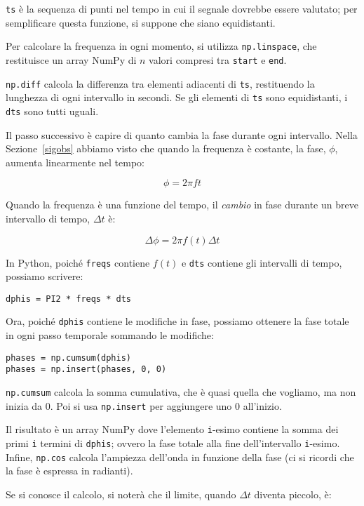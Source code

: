 \documentclass[12pt,a4paper]{book}
\begin{document}
{\tt ts} è la sequenza di punti nel tempo in cui il segnale dovrebbe essere valutato; per semplificare questa funzione, si suppone che siano equidistanti.

Per calcolare la frequenza in ogni momento, si utilizza {\tt np.linspace}, che restituisce un array NumPy di $n$ valori compresi tra {\tt start} e {\tt end}.

{\tt np.diff} calcola la differenza tra elementi adiacenti di {\tt ts}, restituendo la lunghezza di ogni intervallo in secondi. Se gli elementi di {\tt ts} sono equidistanti, i {\tt dts} sono tutti uguali.

Il passo successivo è capire di quanto cambia la fase durante ogni intervallo. Nella Sezione~\ref{sigobs} abbiamo visto che quando la frequenza è costante, la fase, $\phi$, aumenta linearmente nel tempo:

%
\[ \phi = 2 \pi f t \] 

%
Quando la frequenza è una funzione del tempo, il {\em cambio} in fase durante un breve intervallo di tempo, $\Delta t$ è:

%
\[ \Delta \phi = 2 \pi f(t) \Delta t \] 

%
In Python, poiché {\tt freqs} contiene $f(t)$ e {\tt dts} contiene gli intervalli di tempo, possiamo scrivere:

\begin{verbatim} 
dphis = PI2 * freqs * dts
 \end{verbatim} 

Ora, poiché {\tt dphis} contiene le modifiche in fase, possiamo ottenere la fase totale in ogni passo temporale sommando le modifiche:

\begin{verbatim} 
phases = np.cumsum(dphis)
phases = np.insert(phases, 0, 0)
 \end{verbatim} 

{\tt np.cumsum} calcola la somma cumulativa, che è quasi quella che vogliamo, ma non inizia da 0. Poi si usa {\tt np.insert} per aggiungere uno 0 all'inizio.

Il risultato è un array NumPy dove l'elemento {\tt i}-esimo contiene la somma dei primi {\tt i} termini di {\tt dphis}; ovvero la fase totale alla fine dell'intervallo {\tt i}-esimo. Infine, {\tt np.cos} calcola l'ampiezza dell'onda in funzione della fase (ci si ricordi che la fase è espressa in radianti).

Se si conosce il calcolo, si noterà che il limite, quando $\Delta t$ diventa piccolo, è:
\end{document}
